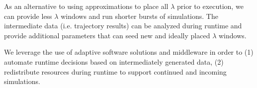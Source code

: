 As an alternative to using approximations to place all $\lambda$ prior to 
execution, we can provide less $\lambda$ windows and run shorter bursts of 
simulations. The intermediate data (i.e. trajectory results) can be analyzed 
during runtime and provide additional parameters that can seed new and ideally 
placed $\lambda$ windows. 

We leverage the use of adaptive software solutions and middleware in
order to (1) automate runtime decisions based on intermediately 
generated data, (2) redistribute resources during runtime to support continued 
and incoming simulations. 






